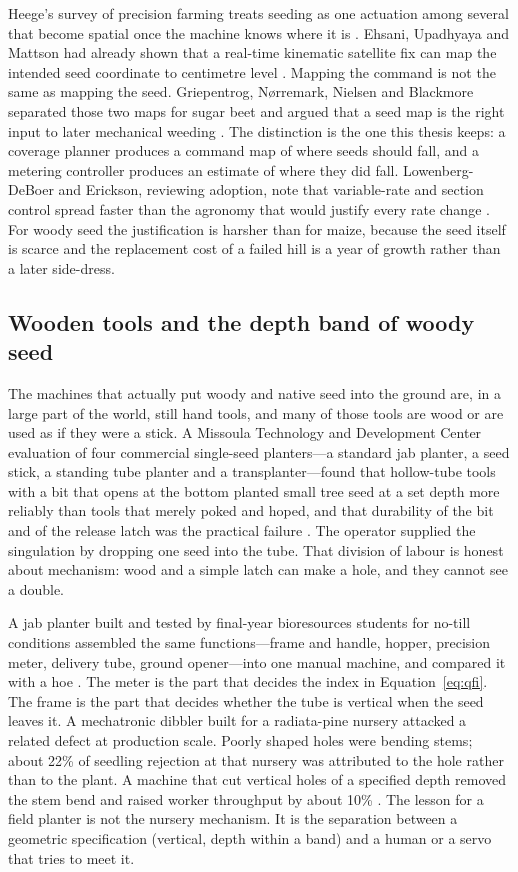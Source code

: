 Heege's survey of precision farming treats seeding as one actuation among several that become spatial once the machine knows where it is \cite{heege2013}. Ehsani, Upadhyaya and Mattson had already shown that a real-time kinematic satellite fix can map the intended seed coordinate to centimetre level \cite{ehsani2004}. Mapping the command is not the same as mapping the seed. Griepentrog, N{\o}rremark, Nielsen and Blackmore separated those two maps for sugar beet and argued that a seed map is the right input to later mechanical weeding \cite{griepentrog2005}. The distinction is the one this thesis keeps: a coverage planner produces a command map of where seeds should fall, and a metering controller produces an estimate of where they did fall. Lowenberg-DeBoer and Erickson, reviewing adoption, note that variable-rate and section control spread faster than the agronomy that would justify every rate change \cite{lowenberg2019}. For woody seed the justification is harsher than for maize, because the seed itself is scarce and the replacement cost of a failed hill is a year of growth rather than a later side-dress.

\subsection{Wooden tools and the depth band of woody seed}

The machines that actually put woody and native seed into the ground are, in a large part of the world, still hand tools, and many of those tools are wood or are used as if they were a stick. A Missoula Technology and Development Center evaluation of four commercial single-seed planters---a standard jab planter, a seed stick, a standing tube planter and a transplanter---found that hollow-tube tools with a bit that opens at the bottom planted small tree seed at a set depth more reliably than tools that merely poked and hoped, and that durability of the bit and of the release latch was the practical failure \cite{usdaplanter}. The operator supplied the singulation by dropping one seed into the tube. That division of labour is honest about mechanism: wood and a simple latch can make a hole, and they cannot see a double.

A jab planter built and tested by final-year bioresources students for no-till conditions assembled the same functions---frame and handle, hopper, precision meter, delivery tube, ground opener---into one manual machine, and compared it with a hoe \cite{jab2010}. The meter is the part that decides the index in Equation~\eqref{eq:qfi}. The frame is the part that decides whether the tube is vertical when the seed leaves it. A mechatronic dibbler built for a radiata-pine nursery attacked a related defect at production scale. Poorly shaped holes were bending stems; about \num{22}\% of seedling rejection at that nursery was attributed to the hole rather than to the plant. A machine that cut vertical holes of a specified depth removed the stem bend and raised worker throughput by about \num{10}\% \cite{dibbler}. The lesson for a field planter is not the nursery mechanism. It is the separation between a geometric specification (vertical, depth within a band) and a human or a servo that tries to meet it.

